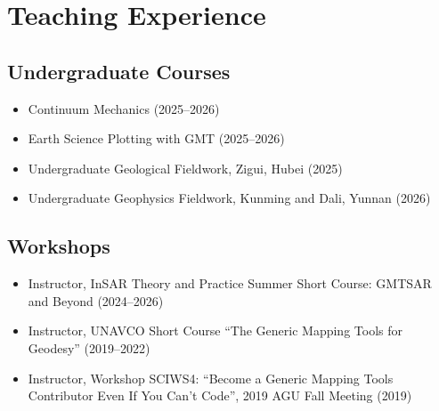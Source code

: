 \section{Teaching Experience}

\subsection{Undergraduate Courses}
\begin{itemize}
\item Continuum Mechanics (2025--2026)
\item Earth Science Plotting with GMT (2025--2026)
\item Undergraduate Geological Fieldwork, Zigui, Hubei (2025)
\item Undergraduate Geophysics Fieldwork, Kunming and Dali, Yunnan (2026)
\end{itemize}

\subsection{Workshops}
\begin{itemize}
\item Instructor, InSAR Theory and Practice Summer Short Course: GMTSAR and Beyond (2024--2026)
\item Instructor, UNAVCO Short Course ``The Generic Mapping Tools for Geodesy'' (2019--2022)
\item Instructor, Workshop SCIWS4: ``Become a Generic Mapping Tools Contributor Even If You Can't Code'', 2019 AGU Fall Meeting (2019)
\end{itemize}
